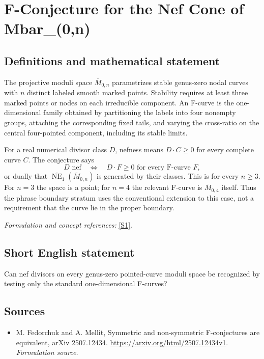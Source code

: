 \documentclass[11pt]{article}
\begin{document}
\section*{\texorpdfstring{F-Conjecture for the Nef Cone of Mbar\_(0,n)}{F-Conjecture for the Nef Cone of Mbar\_(0,n)}}\label{499}
\subsection{Definitions and mathematical statement}
The projective moduli space $\overline M_{0,n}$ parametrizes stable genus-zero nodal curves with $n$ distinct labeled smooth marked points. Stability requires at least three marked points or nodes on each irreducible component. An F-curve is the one-dimensional family obtained by partitioning the labels into four nonempty groups, attaching the corresponding fixed tails, and varying the cross-ratio on the central four-pointed component, including its stable limits.

For a real numerical divisor class $D$, nefness means $D\cdot C\ge0$ for every complete curve $C$. The conjecture says
\[
 D\text{ nef}\quad\Longleftrightarrow\quad
 D\cdot F\ge0\text{ for every F-curve }F,
\]
or dually that $\overline{\operatorname{NE}}_1(\overline M_{0,n})$ is generated by their classes. This is for every $n\ge3$. For $n=3$ the space is a point; for $n=4$ the relevant F-curve is $\overline M_{0,4}$ itself. Thus the phrase boundary stratum uses the conventional extension to this case, not a requirement that the curve lie in the proper boundary.
\par\smallskip\textit{Formulation and concept references:} \href{https://arxiv.org/html/2507.12434v1}{[S1]}.

\subsection{Short English statement}
Can nef divisors on every genus-zero pointed-curve moduli space be recognized by testing only the standard one-dimensional F-curves?
\subsection{Sources}
\begin{itemize}
\item[S1]M. Fedorchuk and A. Mellit, Symmetric and non-symmetric F-conjectures are equivalent, arXiv 2507.12434.
\url{https://arxiv.org/html/2507.12434v1}.
\textit{Formulation source.}
\end{itemize}
\end{document}
